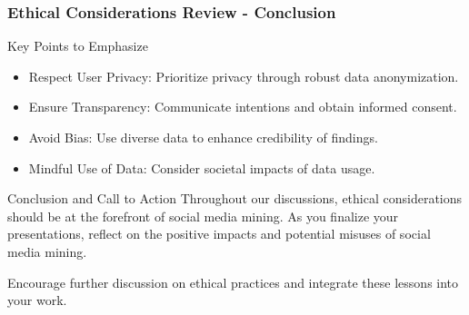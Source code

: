 \documentclass{beamer}
\begin{document}
\begin{frame}[fragile]
    \frametitle{Ethical Considerations Review - Conclusion}
    \begin{block}{Key Points to Emphasize}
        \begin{itemize}
            \item Respect User Privacy: Prioritize privacy through robust data anonymization.
            \item Ensure Transparency: Communicate intentions and obtain informed consent.
            \item Avoid Bias: Use diverse data to enhance credibility of findings.
            \item Mindful Use of Data: Consider societal impacts of data usage.
        \end{itemize}
    \end{block}
    
    \begin{block}{Conclusion and Call to Action}
        Throughout our discussions, ethical considerations should be at the forefront of social media mining. 
        As you finalize your presentations, reflect on the positive impacts and potential misuses of social media mining.
        
        Encourage further discussion on ethical practices and integrate these lessons into your work.
    \end{block}
\end{frame}
\end{document}
